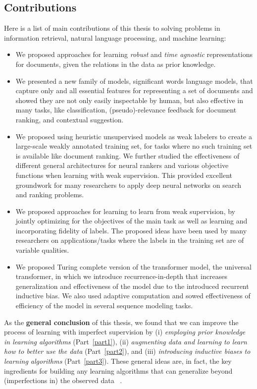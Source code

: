 \subsection{Contributions}
Here is a list of main contributions of this thesis to solving problems in information retrieval, natural language processing, and machine learning:
\begin{itemize}
    \item We proposed approaches for learning \emph{robust} and \emph{time agnostic} representations for documents, given the relations in the data as prior knowledge.
    \item We presented a new family of models, significant words language models, that capture only and all essential features for representing a set of documents and showed they are not only easily inspectable by human, but also effective in many tasks, like classification, (pseudo)-relevance feedback for document ranking, and contextual suggestion. 
    \item We proposed using heuristic unsupervised models as weak labelers to create a large-scale weakly annotated training set, for tasks where no such training set is available like document ranking. We further studied the effectiveness of different general architectures for neural rankers and various objective functions when learning with weak supervision. This provided excellent groundwork for many researchers to apply deep neural networks on search and ranking problems.
    \item We proposed approaches for learning to learn from weak supervision, by jointly optimizing for the objectives of the main task as well as learning and incorporating fidelity of labels. The proposed ideas have been used by many researchers on applications/tasks where the labels in the training set are of variable qualities.  
    \item We proposed Turing complete version of the transformer model, the universal transformer, in which we introduce recurrence-in-depth that increases generalization and effectiveness of the model due to the introduced recurrent inductive bias. We also used adaptive computation and sowed effectiveness of efficiency of the model in several sequence modeling tasks. 
\end{itemize}


\bigskip
As the \textbf{general conclusion} of this thesis, we found that we can improve the process of learning with imperfect supervision by (i) \emph{employing  prior knowledge in learning algorithms} (Part~\ref{part1}), (ii) \emph{augmenting data and learning to learn how to better use the data} (Part~\ref{part2}), and (iii) \emph{introducing inductive biases to learning algorithms} (Part~\ref{part3}). 
%
These general ideas are, in fact, the key ingredients for building any learning algorithms that can generalize beyond (imperfections in) the observed data ~\citep{Mitchell80theneed}.

